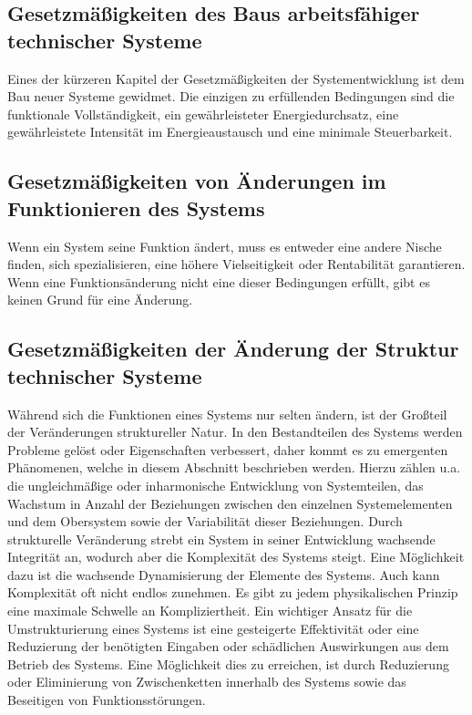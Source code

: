\documentclass[a4paper,11pt]{article}
\begin{document}
\subsection{Gesetzmäßigkeiten des Baus arbeitsfähiger technischer Systeme}

Eines der kürzeren Kapitel der Gesetzmäßigkeiten der Systementwicklung ist dem
Bau neuer Systeme gewidmet. Die einzigen zu erfüllenden Bedingungen sind die
funktionale Vollständig\-keit, ein gewährleisteter Energiedurchsatz, eine
gewährleistete Intensität im Energieaustausch und eine minimale Steuerbarkeit.

\subsection{Gesetzmäßigkeiten von Änderungen im Funktionieren des Systems}

Wenn ein System seine Funktion ändert, muss es entweder eine andere Nische
finden, sich spezialisieren, eine höhere Vielseitigkeit oder Rentabilität
garantieren. Wenn eine Funktionsänderung nicht eine dieser Bedingungen
erfüllt, gibt es keinen Grund für eine Änderung.

\subsection{Gesetzmäßigkeiten der Änderung der Struktur technischer Systeme}

Während sich die Funktionen eines Systems nur selten ändern, ist der Großteil
der Verände\-rungen struktureller Natur. In den Bestandteilen des Systems
werden Probleme gelöst oder Eigenschaften verbessert, daher kommt es zu
emergenten Phänomenen, welche in diesem Abschnitt beschrieben werden. Hierzu
zählen u.a. die ungleichmäßige oder inharmonische Entwicklung von
Systemteilen, das Wachstum in Anzahl der Beziehungen zwischen den einzelnen
Systemelementen und dem Obersystem sowie der Variabilität dieser
Beziehungen. Durch strukturelle Veränderung strebt ein System in seiner
Entwicklung wachsende Integrität an, wodurch aber die Komplexität des Systems
steigt. Eine Möglichkeit dazu ist die wachsende Dynamisierung der Elemente des
Systems. Auch kann Komplexität oft nicht endlos zunehmen. Es gibt zu jedem
physikalischen Prinzip eine maximale Schwelle an Kompliziertheit. Ein
wichtiger Ansatz für die Umstrukturierung eines Systems ist eine gesteigerte
Effektivität oder eine Reduzierung der benötigten Eingaben oder schädlichen
Auswirkungen aus dem Betrieb des Systems.  Eine Möglichkeit dies zu erreichen,
ist durch Reduzierung oder Eliminierung von Zwischenketten innerhalb des
Systems sowie das Beseitigen von Funktionsstörungen.
\end{document}
